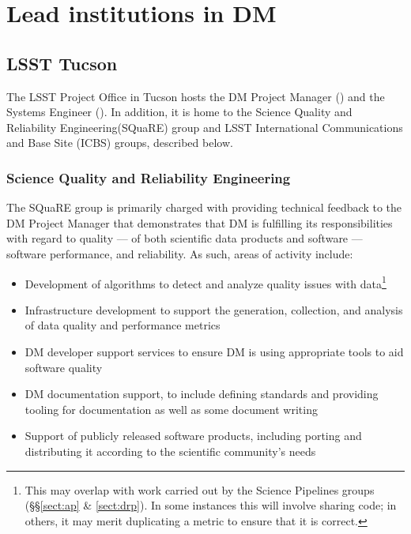 \section{Lead institutions in DM \label{sect:leadtutes}}

\subsection{LSST Tucson\label{sect:tucson}}

The LSST Project Office in Tucson hosts the DM Project Manager () and the Systems Engineer ().
In addition, it is home to the Science Quality and Reliability Engineering(SQuaRE) group and LSST International Communications and Base Site (ICBS) groups, described below.

\subsubsection{Science Quality and Reliability Engineering \label{sect:square}}

The SQuaRE group is primarily charged with providing technical feedback to the DM Project Manager that demonstrates that DM is fulfilling its responsibilities with regard to quality — of both scientific data products and software — software performance, and reliability. As such, areas of activity include:

\begin{itemize}

\item Development of algorithms to detect and analyze quality issues with data\footnote{This may overlap with work carried out by the Science Pipelines groups (\S\S\ref{sect:ap} \& \ref{sect:drp}). In some instances this will involve sharing code; in others, it may merit duplicating a metric to ensure that it is correct.}

\item Infrastructure development to support the generation, collection, and analysis of data quality and performance metrics

\item DM developer support services to ensure DM is using appropriate tools to aid software quality

\item DM documentation support, to include defining standards and providing tooling for documentation as well as some document writing

\item Support of publicly released software products, including porting and distributing it according to the scientific community's needs

\end{itemize}

